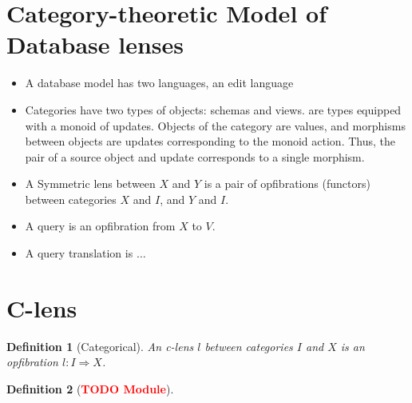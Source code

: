 \documentclass[a4paper,10pt]{article}
\newtheorem{definition}{Definition}
\newcommand{\finish}[1]{#1}
\newcommand{\comment}[1]{\finish{\textbf{\textcolor{red}{#1}}}}
\begin{document}
\section{Category-theoretic Model of Database lenses}
\begin{itemize}
 \item A database model has two languages, an edit language
 \item Categories have two types of objects: schemas and views. are types equipped with a monoid of updates. Objects of the category are values, and morphisms between objects are updates corresponding to the monoid action. Thus, the pair of a source object and update corresponds to a single morphism. 
 \item A Symmetric lens between $X$ and $Y$ is a pair of opfibrations (functors) between categories $X$ and $I$, and $Y$ and $I$.
 \item A query is an opfibration from $X$ to $V$.
 \item A query translation is $\ldots$
\end{itemize}

\section{C-lens}
\begin{definition}[Categorical]
 An c-lens $l$ between categories $I$ and $X$ is an opfibration $l : I \Rightarrow X$.
\end{definition}

\begin{definition} [\comment{TODO Module}]
 
\end{definition}
\end{document}
